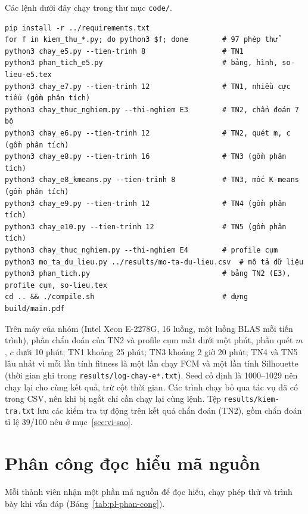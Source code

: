 Các lệnh dưới đây chạy trong thư mục \texttt{code/}.
\begin{Verbatim}[fontsize=\footnotesize,frame=single]
pip install -r ../requirements.txt
for f in kiem_thu_*.py; do python3 $f; done        # 97 phép thử
python3 chay_e5.py --tien-trinh 8                  # TN1
python3 phan_tich_e5.py                            # bảng, hình, so-lieu-e5.tex
python3 chay_e7.py --tien-trinh 12                 # TN1, nhiều cực tiểu (gồm phân tích)
python3 chay_thuc_nghiem.py --thi-nghiem E3        # TN2, chẩn đoán 7 bộ
python3 chay_e6.py --tien-trinh 12                 # TN2, quét m, c (gồm phân tích)
python3 chay_e8.py --tien-trinh 16                 # TN3 (gồm phân tích)
python3 chay_e8_kmeans.py --tien-trinh 8           # TN3, mốc K-means (gồm phân tích)
python3 chay_e9.py --tien-trinh 12                 # TN4 (gồm phân tích)
python3 chay_e10.py --tien-trinh 12                # TN5 (gồm phân tích)
python3 chay_thuc_nghiem.py --thi-nghiem E4        # profile cụm
python3 mo_ta_du_lieu.py ../results/mo-ta-du-lieu.csv  # mô tả dữ liệu
python3 phan_tich.py                               # bảng TN2 (E3), profile cụm, so-lieu.tex
cd .. && ./compile.sh                              # dựng build/main.pdf
\end{Verbatim}
Trên máy của nhóm (Intel Xeon E-2278G, 16 luồng, một luồng BLAS mỗi tiến trình), phần chẩn đoán của TN2 và profile cụm
mất dưới một phút, phần quét $m$, $c$ dưới 10 phút; TN1 khoảng 25 phút; TN3 khoảng 2 giờ 20 phút; TN4 và TN5 lâu nhất vì mỗi
lần tính fitness là một lần chạy FCM và một lần tính Silhouette (thời gian ghi trong \texttt{results/log-chay-e*.txt}). Seed cố
định là 1000--1029 nên chạy lại cho cùng kết quả, trừ cột thời gian. Các trình chạy bỏ qua tác vụ đã có trong CSV, nên khi bị ngắt chỉ cần chạy
lại cùng lệnh. Tệp \texttt{results/kiem-tra.txt} lưu các kiểm tra tự động trên kết quả chẩn đoán (TN2), gồm chẩn đoán tỉ lệ 39/100 nêu ở
mục~\ref{sec:vi-sao}.

\section*{Phân công đọc hiểu mã nguồn}

Mỗi thành viên nhận một phần mã nguồn để đọc hiểu, chạy phép thử và trình bày
khi vấn đáp (Bảng~\ref{tab:pl-phan-cong}).

